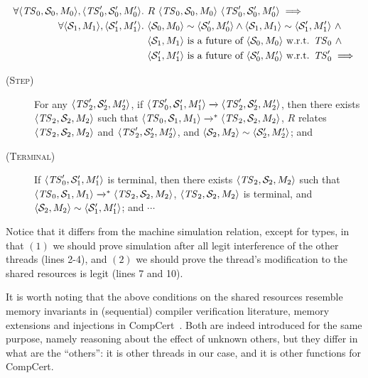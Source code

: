\begin{align*}
  \forall {\langle{\mathit{TS}_0,{\cal S}_0,M_0}\rangle}, {\langle{\mathit{TS}'_0,{\cal S}'_0,M'_0}\rangle}.~ & R~{\langle{\mathit{TS}_0,{\cal S}_0,M_0}\rangle}~{\langle{\mathit{TS}'_0,{\cal S}'_0,M'_0}\rangle} \implies \\
  \forall {\langle{{\cal S}_1,M_1}\rangle}, {\langle{{\cal S}'_1,M'_1}\rangle}.~ & {\langle{{\cal S}_0,M_0}\rangle} \sim {\langle{{\cal S}'_0,M'_0}\rangle} \land {\langle{{\cal S}_1,M_1}\rangle} \sim {\langle{{\cal S}'_1,M'_1}\rangle} ~ \land \\
                                                                        & \mbox{${\langle{{\cal S}_1,M_1}\rangle}$ is a future of ${\langle{{\cal S}_0,M_0}\rangle}$ w.r.t. $\mathit{TS}_0$} ~ \land \\
                                                                        & \mbox{${\langle{{\cal S}'_1,M'_1}\rangle}$ is a future of ${\langle{{\cal S}'_0,M'_0}\rangle}$ w.r.t. $\mathit{TS}'_0$} \implies
\end{align*}
\begin{center}
  \begin{minipage}{0.9\textwidth}
    \begin{description}
    \item[\textsc{(Step)}] For any ${\langle{\mathit{TS}'_2,{\cal S}'_2,M'_2}\rangle}$, if
      ${\langle{\mathit{TS}'_0,{\cal S}'_1,M'_1}\rangle} \xrightarrow{} {\langle{\mathit{TS}'_2,{\cal S}'_2,M'_2}\rangle}$, then there exists
      ${\langle{\mathit{TS}_2,{\cal S}_2,M_2}\rangle}$ such that
      ${\langle{\mathit{TS}_0,{\cal S}_1,M_1}\rangle} \xrightarrow{}^* {\langle{\mathit{TS}_2,{\cal S}_2,M_2}\rangle}$, $R$ relates
      ${\langle{\mathit{TS}_2,{\cal S}_2,M_2}\rangle}$ and ${\langle{\mathit{TS}'_2,{\cal S}'_2,M'_2}\rangle}$, and
      ${\langle{{\cal S}_2,M_2}\rangle} \sim {\langle{{\cal S}'_2,M'_2}\rangle}$; and
    \item[\textsc{(Terminal)}] If ${\langle{\mathit{TS}'_0,{\cal S}'_1,M'_1}\rangle}$ is terminal, then there exists
      ${\langle{\mathit{TS}_2,{\cal S}_2,M_2}\rangle}$ such that
      ${\langle{\mathit{TS}_0,{\cal S}_1,M_1}\rangle} \xrightarrow{}^* {\langle{\mathit{TS}_2,{\cal S}_2,M_2}\rangle}$,
      ${\langle{\mathit{TS}_2,{\cal S}_2,M_2}\rangle}$ is terminal, and
      ${\langle{{\cal S}_2,M_2}\rangle} \sim {\langle{{\cal S}'_1,M'_1}\rangle}$; and $\cdots$
    \end{description}
  \end{minipage}
\end{center}
%
Notice that it differs from the machine simulation relation, except for types, in that $(1)$ we
should prove simulation after all legit interference of the other threads (lines 2-4), and $(2)$ we
should prove the thread's modification to the shared resources is legit (lines 7 and 10).

It is worth noting that the above conditions on the shared resources resemble memory invariants in
(sequential) compiler verification literature, \eg{} memory extensions and injections in
CompCert~\cite{Leroy-Appel-Blazy-Stewart-memory-v2}.  Both are indeed introduced for the same
purpose, namely reasoning about the effect of unknown others, but they differ in what are the
``others'': it is other threads in our case, and it is other functions for \eg{} CompCert.




